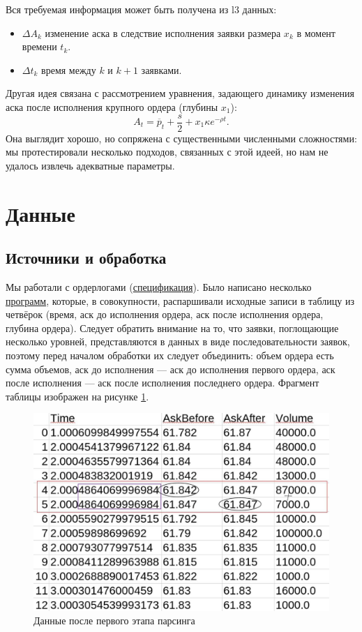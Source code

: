Вся требуемая информация может быть получена из l3 данных: 
\begin{itemize}
    \item $\Delta A_{k}$ изменение аска в следствие исполнения заявки размера $x_k$ в момент времени $t_k$.
    \item $\Delta t_{k}$ время между $k$ и $k + 1$ заявками.
\end{itemize}

Другая идея связана с рассмотрением уравнения, задающего динамику изменения аска после исполнения крупного ордера (глубины $x_1$):
\begin{equation*}
        A_t = \overline p _t + \frac{s}{2} + x_1 \kappa e^{- \rho t}.
\end{equation*}
Она выглядит хорошо, но сопряжена с существенными численными сложностями: мы протестировали несколько подходов, связанных
с этой идеей, но нам не удалось извлечь адекватные параметры.



\section{Данные}
\subsection{Источники и обработка}
Мы работали с ордерлогами (\href{https://fs.moex.com/f/3198/specifikacija-formata-dannyh.pdf}{спецификация}). Было написано несколько 
\href{https://github.com/VsevolodZaostrovsky/OWModel/tree/main/New%20data/data%20preparing}{программ},
которые, в совокупности, распаршивали исходные записи в таблицу из четвёрок (время, аск до исполнения ордера, аск после исполнения ордера, глубина ордера). 
Следует обратить внимание на то, что заявки, поглощающие несколько уровней, представляются в данных в виде последовательности заявок, поэтому 
перед началом обработки их следует объединить: объем ордера есть сумма объемов, аск до исполнения --- аск до исполнения первого ордера,
аск после исполнения --- аск после исполнения последнего ордера. Фрагмент таблицы изображен на рисунке \ref{datacsv}.
\begin{figure}
    \includegraphics[scale=0.35]{fig/datscsv.jpg}
    \caption{Данные после первого этапа парсинга}
    \label{datacsv}
\end{figure}

